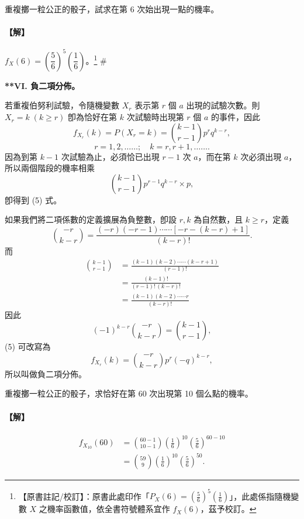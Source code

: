\medskip
\begin{example}\label{ex:b5-5-8}
重複擲一粒公正的骰子，試求在第 6 次始出現一點的機率。
\end{example}
\paragraph{【解】}
$f_X(6) = \left(\dfrac{5}{6}\right)^5 \left(\dfrac{1}{6}\right)$。\label{note:b5-ch5-p151-px6}\footnote{【原書註記/校訂】：原書此處印作「$P_X(6) = \left(\frac{5}{6}\right)^5 \left(\frac{1}{6}\right)$」，此處係指隨機變數 $X$ 之機率函數值，依全書符號體系宜作 $f_X(6)$，茲予校訂。} \hfill $\#$

\medskip
\noindent\textbf{**VI. 負二項分佈。}

若重複伯努利試驗，令隨機變數 $X_r$ 表示第 $r$ 個 $a$ 出現的試驗次數。則 $X_r = k \; (k \ge r)$ 卽為恰好在第 $k$ 次試驗時出現第 $r$ 個 $a$ 的事件，因此
\begin{equation}
f_{X_r}(k) = P(X_r = k) = \binom{k-1}{r-1} p^r q^{k-r}, \label{eq:b5-ch5-5}
\end{equation}
\[
r = 1, 2, \dots\dots; \quad k = r, r+1, \dots\dots.
\]
因為到第 $k-1$ 次試驗為止，必須恰已出現 $r-1$ 次 $a$，而在第 $k$ 次必須出現 $a$，所以兩個階段的機率相乘
\[
\binom{k-1}{r-1} p^{r-1} q^{k-r} \times p,
\]
卽得到 (5) 式。

如果我們將二項係數的定義擴展為負整數，卽設 $r, k$ 為自然數，且 $k \ge r$，定義
\[
\binom{-r}{k-r} = \frac{(-r)(-r-1)\cdots\cdots [-r-(k-r)+1]}{(k-r)!}.
\]
而
\begin{align*}
\binom{k-1}{r-1} &= \frac{(k-1)(k-2)\cdots\cdots(k-r+1)}{(r-1)!} \\
&= \frac{(k-1)!}{(r-1)!\, (k-r)!} \\
&= \frac{(k-1)(k-2)\cdots\cdots r}{(k-r)!}
\end{align*}
因此
\[
(-1)^{k-r} \binom{-r}{k-r} = \binom{k-1}{r-1},
\]
(5) 可改寫為
\[
f_{X_r}(k) = \binom{-r}{k-r} p^r (-q)^{k-r},
\]
所以叫做負二項分佈。

\medskip
\begin{example}[**]\label{ex:b5-5-9}
重複擲一粒公正的骰子，求恰好在第 60 次出現第 10 個么點的機率。
\end{example}
\paragraph{【解】}
\begin{align*}
f_{X_{10}}(60) &= \binom{60-1}{10-1} \left(\frac{1}{6}\right)^{10} \left(\frac{5}{6}\right)^{60-10} \\
&= \binom{59}{9} \left(\frac{1}{6}\right)^{10} \left(\frac{5}{6}\right)^{50}. \tag*{\#}
\end{align*}

